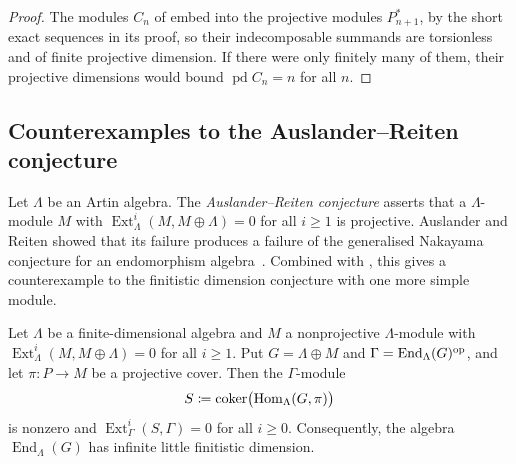 \begin{proof}
  The modules $C_n$ of  embed into the projective
  modules $P_{n+1}^*$, by the short exact sequences in its proof, so their
  indecomposable summands are torsionless and of finite projective
  dimension. If there were only finitely many of them, their projective
  dimensions would bound ${\operatorname{pd}C_n=n}$ for all $n$.
\end{proof}

\subsection{Counterexamples to the Auslander--Reiten conjecture}
\label{subsec:auslander-reiten}

Let $\Lambda$ be an Artin algebra. The \emph{Auslander--Reiten conjecture}
asserts that a $\Lambda$-module $M$ with
${\operatorname{Ext}^i_\Lambda(M,M\oplus\Lambda)=0}$ for all ${i\geq1}$ is
projective. Auslander and Reiten showed that its failure
produces a failure of the generalised Nakayama conjecture for an endomorphism
algebra~\cite[Theorem~1.1(b)]{AR75a}. Combined with ,
this gives a counterexample to the finitistic dimension conjecture with one
more simple module.

\begin{theorem}
  \label{thm:ar-to-findim}
  Let $\Lambda$ be a finite-dimensional algebra and $M$ a nonprojective
  $\Lambda$-module with ${\operatorname{Ext}^i_\Lambda(M,M\oplus\Lambda)}={0}$ for
  all ${i\geq1}$. Put ${G=\Lambda\oplus M}$ and
  ${\Gamma}={\operatorname{End}_\Lambda(G)^{\mathrm{op}}}$,
  and let ${\pi\colon P\to M}$ be a projective cover. Then the $\Gamma$-module
  \[
    S\coloneqq\operatorname{coker}\bigl(\Hom[\Lambda]{G}{\pi}\bigr)
  \]
  is nonzero and ${\operatorname{Ext}^i_\Gamma(S,\Gamma)=0}$ for all ${i\geq0}$.
  Consequently, the algebra $\operatorname{End}_\Lambda(G)$ has infinite
  little finitistic dimension.
\end{theorem}

